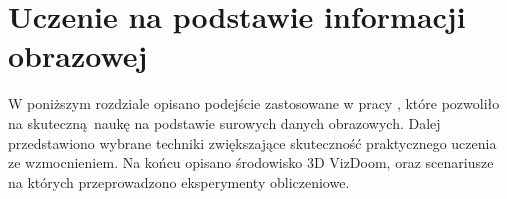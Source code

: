 \chapter{Uczenie na podstawie informacji obrazowej}

W poniższym rozdziale opisano podejście zastosowane w pracy \cite{mnih2015human}, które pozwoliło na skuteczną naukę na podstawie surowych danych obrazowych. Dalej przedstawiono wybrane techniki zwiększające skuteczność praktycznego uczenia ze wzmocnieniem. Na końcu opisano środowisko 3D VizDoom, oraz scenariusze na których przeprowadzono eksperymenty obliczeniowe.




